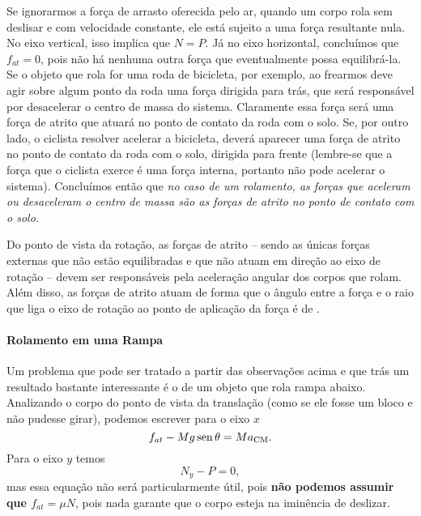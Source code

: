 Se ignorarmos a força de arrasto oferecida pelo ar, quando um corpo rola sem deslisar e com velocidade constante, ele está sujeito a uma força resultante nula. No eixo vertical, isso implica que $N = P$. Já no eixo horizontal, concluímos que $f_{at} = 0$, pois não há nenhuma outra força que eventualmente possa equilibrá-la. Se o objeto que rola for uma roda de bicicleta, por exemplo, ao frearmos deve agir sobre algum ponto da roda uma força dirigida para trás, que será responsável por desacelerar o centro de massa do sistema. Claramente essa força será uma força de atrito que atuará no ponto de contato da roda com o solo. Se, por outro lado, o ciclista resolver acelerar a bicicleta, deverá aparecer uma força de atrito no ponto de contato da roda com o solo, dirigida para frente (lembre-se que a força que o ciclista exerce é uma força interna, portanto não pode acelerar o sistema). Concluímos então que \emph{no caso de um rolamento, as forças que aceleram ou desaceleram o centro de massa são as forças de atrito no ponto de contato com o solo.}

Do ponto de vista da rotação, as forças de atrito -- sendo as únicas forças externas que não estão equilibradas e que não atuam em direção ao eixo de rotação -- devem ser responsáveis pela aceleração angular dos corpos que rolam. Além disso, as forças de atrito atuam de forma que o ângulo entre a força e o raio que liga o eixo de rotação ao ponto de aplicação da força é de .

\paragraph{Rolamento em uma Rampa}

Um problema que pode ser tratado a partir das observações acima e que trás um resultado bastante interessante é o de um objeto que rola rampa abaixo. Analizando o corpo do ponto de vista da translação (como se ele fosse um bloco e não pudesse girar), podemos escrever para o eixo $x$ 
\begin{equation}
  f_{at} - Mg \operatorname{sen}\theta = M a_{\textrm{CM}}.
\end{equation}
%
Para o eixo $y$ temos
\begin{equation}
  N_y - P = 0,
\end{equation}
%
mas essa equação não será particularmente útil, pois \textbf{não podemos assumir que $f_{at} = \mu N$}, pois nada garante que o corpo esteja na iminência de deslizar.

